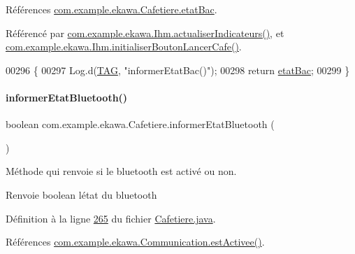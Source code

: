 Références \hyperlink{_cafetiere_8java_source_l00092}{com.\+example.\+ekawa.\+Cafetiere.\+etat\+Bac}.



Référencé par \hyperlink{_ihm_8java_source_l00855}{com.\+example.\+ekawa.\+Ihm.\+actualiser\+Indicateurs()}, et \hyperlink{_ihm_8java_source_l00526}{com.\+example.\+ekawa.\+Ihm.\+initialiser\+Bouton\+Lancer\+Cafe()}.


\begin{DoxyCode}
00296     \{
00297         Log.d(\hyperlink{classcom_1_1example_1_1ekawa_1_1_cafetiere_aa0c1fd99a2508b06c462aea17034aa91}{TAG}, \textcolor{stringliteral}{"informerEtatBac()"});
00298         \textcolor{keywordflow}{return} \hyperlink{classcom_1_1example_1_1ekawa_1_1_cafetiere_a058f7a18cd9c0567d583b8bc6250d143}{etatBac};
00299     \}
\end{DoxyCode}
\mbox{\label{classcom_1_1example_1_1ekawa_1_1_cafetiere_aeff88ad385713a7897074dcdb76077a5}} 
\paragraph{\texorpdfstring{informer\+Etat\+Bluetooth()}{informerEtatBluetooth()}}
{\footnotesize\ttfamily boolean com.\+example.\+ekawa.\+Cafetiere.\+informer\+Etat\+Bluetooth (\begin{DoxyParamCaption}{ }\end{DoxyParamCaption})}



Méthode qui renvoie si le bluetooth est activé ou non. 

\begin{DoxyReturn}{Renvoie}
boolean l\textquotesingle{}état du bluetooth 
\end{DoxyReturn}


Définition à la ligne \hyperlink{_cafetiere_8java_source_l00265}{265} du fichier \hyperlink{_cafetiere_8java_source}{Cafetiere.\+java}.



Références \hyperlink{_communication_8java_source_l00268}{com.\+example.\+ekawa.\+Communication.\+est\+Activee()}.



